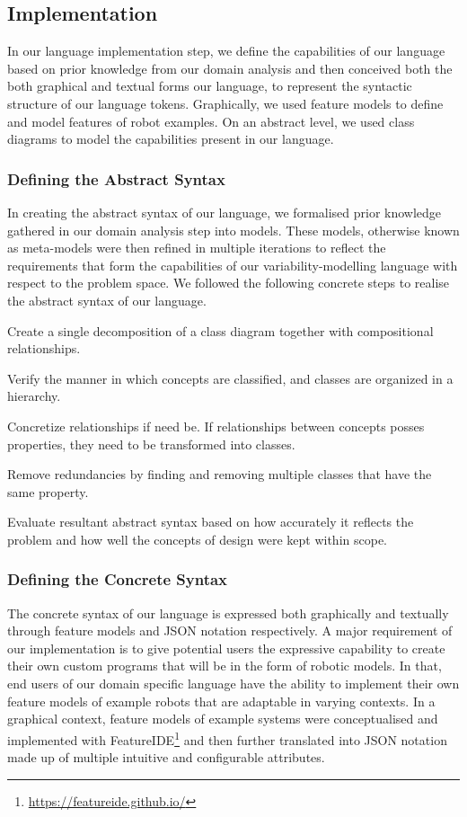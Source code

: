 \documentclass[conference]{IEEEtran}
\newcommand{\foot}[1]{\footnote{\url{#1}}}
\begin{document}
\subsection{Implementation}
In our language implementation step, we define the capabilities of our language based on prior knowledge from our domain analysis and then conceived both the both graphical and textual forms our language, to represent the syntactic structure of our language tokens. Graphically, we used feature models to define and model features of robot examples. On an abstract level, we used class diagrams to model the capabilities present in our language.

\subsubsection{Defining the Abstract Syntax}
In creating the abstract syntax of our language, we formalised prior knowledge gathered in our domain analysis step into models. These models, otherwise known as meta-models were then refined in multiple iterations to reflect the requirements that form the capabilities of our variability-modelling language with respect to the problem space. We followed the following concrete steps to realise the abstract syntax of our language.\begin{enumerate*}
    \item Create a single decomposition of a class diagram together with compositional relationships.
    \item Verify the manner in which concepts are classified, and classes are organized in a hierarchy.
    \item Concretize relationships if need be. If relationships between concepts posses properties, they need to be transformed into classes.
    \item Remove redundancies by finding and removing multiple classes that have the same property.
    \item Evaluate resultant abstract syntax based on how accurately it reflects the problem and how well the concepts of design were kept within scope.
\end{enumerate*}

\subsubsection{Defining the Concrete Syntax}
The concrete syntax of our language is expressed both graphically and textually through feature models and JSON notation respectively. A major requirement of our implementation is to give potential users the expressive capability to create their own custom programs that will be in the form of robotic models. In that, end users of our domain specific language have the ability to implement their own feature models of example robots that are adaptable in varying contexts. In a graphical context, feature models of example systems were conceptualised and implemented with FeatureIDE\foot{https://featureide.github.io/} and then further translated into JSON notation made up of multiple intuitive and configurable attributes.
\end{document}
